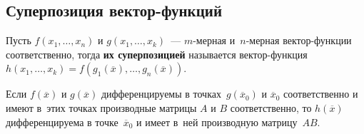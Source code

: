 \subsection{Суперпозиция вектор-функций}
Пусть $f(x_1, \ldots, x_n)$ и $g(x_1, \ldots, x_k)$~--- $m$-мерная и~$n$-мерная вектор-функции соответственно, тогда \textbf{их суперпозицией} называется вектор-функция~$h(x_1, \ldots, x_k) = f(g_1(\overline x), \ldots, g_n(\overline x))$.

\begin{theorem}
Если $f(\overline x)$ и $g(\overline x)$ дифференцируемы в точках~$g(\overline x_0)$ и $\overline x_0$ соответственно и имеют в~этих точках производные матрицы $A$ и $B$ соответственно, то $h(\overline x)$ дифференцируема в точке~$\overline x_0$ и имеет в~ней производную матрицу~$AB$.
\end{theorem}